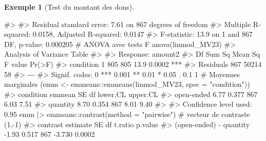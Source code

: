 \documentclass[
  11pt,
  letterpaper,
]{scrbook}
\newenvironment{Shaded}{\begin{snugshade}}{\end{snugshade}}
\newcommand{\AttributeTok}[1]{\textcolor[rgb]{0.40,0.45,0.13}{#1}}
\newcommand{\CommentTok}[1]{\textcolor[rgb]{0.37,0.37,0.37}{#1}}
\newcommand{\FunctionTok}[1]{\textcolor[rgb]{0.28,0.35,0.67}{#1}}
\newcommand{\NormalTok}[1]{\textcolor[rgb]{0.00,0.23,0.31}{#1}}
\newcommand{\OtherTok}[1]{\textcolor[rgb]{0.00,0.23,0.31}{#1}}
\newcommand{\SpecialCharTok}[1]{\textcolor[rgb]{0.37,0.37,0.37}{#1}}
\newcommand{\StringTok}[1]{\textcolor[rgb]{0.13,0.47,0.30}{#1}}
\theoremstyle{definition}
\newtheorem{example}{Exemple}[chapter]
\theoremstyle{definition}
\theoremstyle{plain}
\theoremstyle{plain}
\theoremstyle{remark}
\begin{document}
\begin{example}[Test du montant des
dons]
\begin{Shaded}
\begin{Highlighting}[]
\CommentTok{\#\textgreater{} }
\CommentTok{\#\textgreater{} Residual standard error: 7.61 on 867 degrees of freedom}
\CommentTok{\#\textgreater{} Multiple R{-}squared:  0.0158, Adjusted R{-}squared:  0.0147 }
\CommentTok{\#\textgreater{} F{-}statistic: 13.9 on 1 and 867 DF,  p{-}value: 0.000205}
\CommentTok{\# ANOVA avec tests F}
\FunctionTok{anova}\NormalTok{(linmod\_MV23)}
\CommentTok{\#\textgreater{} Analysis of Variance Table}
\CommentTok{\#\textgreater{} }
\CommentTok{\#\textgreater{} Response: amount2}
\CommentTok{\#\textgreater{}            Df Sum Sq Mean Sq F value Pr(\textgreater{}F)    }
\CommentTok{\#\textgreater{} condition   1    805     805    13.9 0.0002 ***}
\CommentTok{\#\textgreater{} Residuals 867  50214      58                   }
\CommentTok{\#\textgreater{} {-}{-}{-}}
\CommentTok{\#\textgreater{} Signif. codes:  0 \textquotesingle{}***\textquotesingle{} 0.001 \textquotesingle{}**\textquotesingle{} 0.01 \textquotesingle{}*\textquotesingle{} 0.05 \textquotesingle{}.\textquotesingle{} 0.1 \textquotesingle{} \textquotesingle{} 1}
\CommentTok{\# Moyennes marginales}
\NormalTok{(emm }\OtherTok{\textless{}{-}}\NormalTok{ emmeans}\SpecialCharTok{::}\FunctionTok{emmeans}\NormalTok{(linmod\_MV23, }\AttributeTok{spec =} \StringTok{"condition"}\NormalTok{))}
\CommentTok{\#\textgreater{}  condition  emmean    SE  df lower.CL upper.CL}
\CommentTok{\#\textgreater{}  open{-}ended   6.77 0.377 867     6.03     7.51}
\CommentTok{\#\textgreater{}  quantity     8.70 0.354 867     8.01     9.40}
\CommentTok{\#\textgreater{} }
\CommentTok{\#\textgreater{} Confidence level used: 0.95}
\NormalTok{emm }\SpecialCharTok{|\textgreater{}}\NormalTok{ emmeans}\SpecialCharTok{::}\FunctionTok{contrast}\NormalTok{(}\AttributeTok{method =} \StringTok{"pairwise"}\NormalTok{) }\CommentTok{\# vecteur de contraste (1,{-}1)}
\CommentTok{\#\textgreater{}  contrast                estimate    SE  df t.ratio p.value}
\CommentTok{\#\textgreater{}  (open{-}ended) {-} quantity    {-}1.93 0.517 867  {-}3.730  0.0002}
\end{Highlighting}
\end{Shaded}

\end{example}
\end{document}
